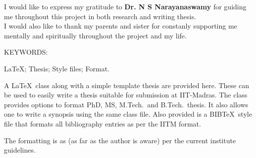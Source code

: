 \documentclass[BTech]{iitmdiss}
\begin{document}
\acknowledgements

I would like to express my gratitude to \textbf{Dr. N S Narayanaswamy} for guiding me throughout this project in both research and writing thesis. \\
I would also like to thank my parents and sister for constanly supporting me mentally and spiritually throughout the project and my life.


\abstract

\noindent KEYWORDS: \hspace*{0.5em} \parbox[t]{4.4in}{\LaTeX ; Thesis;
  Style files; Format.}

\vspace*{24pt}

\noindent A \LaTeX\ class along with a simple template thesis are
provided here.  These can be used to easily write a thesis suitable
for submission at IIT-Madras.  The class provides options to format
PhD, MS, M.Tech.\ and B.Tech.\ thesis.  It also allows one to write a
synopsis using the same class file.  Also provided is a BIB\TeX\ style
file that formats all bibliography entries as per the IITM format.

The formatting is as (as far as the author is aware) per the current
institute guidelines.

\pagebreak


\begin{singlespace}
\tableofcontents
\thispagestyle{empty}

\listoftables
{}
\listoffigures
{}
\end{singlespace}



\end{document}
